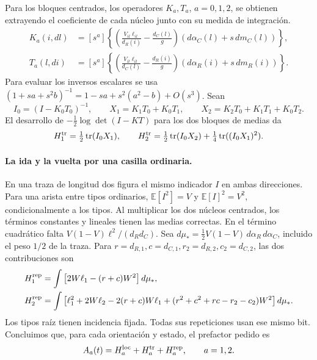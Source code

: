Para los bloques centrados, los operadores \(K_a,T_a\), \(a=0,1,2\), se obtienen
extrayendo el coeficiente de cada núcleo junto con su medida de integración.
\begin{align*}
 K_a(i,dl)&=[s^a]\left\{\left(\frac{V_{il}\ell_{il}}{d_R(i)}-\frac{d_C(l)}g\right)
                       (d\alpha_C(l)+s\,dm_C(l))\right\},\\
 T_a(l,di)&=[s^a]\left\{\left(\frac{V_{il}\ell_{il}}{d_C(l)}-\frac{d_R(i)}g\right)
                       (d\alpha_R(i)+s\,dm_R(i))\right\}.
\end{align*}
Para evaluar los inversos escalares
se usa \((1+sa+s^2b)^{-1}=1-sa+s^2(a^2-b)+O(s^3)\). Sean
\[
 I_0=(I-K_0T_0)^{-1},\qquad X_1=K_1T_0+K_0T_1,\qquad
 X_2=K_2T_0+K_1T_1+K_0T_2 .
\]
El desarrollo de \(-\tfrac12\log\det(I-KT)\) para los dos bloques de medias da
\[
 H_1^{\rm tr}=\tfrac12\operatorname{tr}(I_0X_1),\qquad
 H_2^{\rm tr}=\tfrac12\operatorname{tr}(I_0X_2)+\tfrac14\operatorname{tr}((I_0X_1)^2).
\]

\paragraph{La ida y la vuelta por una casilla ordinaria.}
En una traza de longitud dos figura el mismo indicador \(I\) en ambas direcciones.
Para una arista entre tipos ordinarios, \(\mathbb E[I^2]=V\) y
\(\mathbb E[I]^2=V^2\), condicionalmente a los tipos. Al multiplicar los dos núcleos
centrados, los términos constantes y lineales tienen las medias correctas. En el
término cuadrático falta \(V(1-V)\ell^2/(d_Rd_C)\). Sea \(d\mu_*=\tfrac12
V(1-V)\,d\alpha_R\,d\alpha_C\), incluido el peso \(1/2\) de la traza. Para
\(r=d_{R,1}, c=d_{C,1}, r_2=d_{R,2}, c_2=d_{C,2}\), las dos contribuciones son
\begin{align*}
 H_1^{\rm rep}&=\int \big[2W\ell_1-(r+c)W^2\big]\,d\mu_*,\\
 H_2^{\rm rep}&=\int \big[\ell_1^2+2W\ell_2-2(r+c)W\ell_1
              +(r^2+c^2+rc-r_2-c_2)W^2\big]\,d\mu_* .
\end{align*}
Los tipos raíz tienen incidencia fijada. Todas sus repeticiones usan ese mismo bit.
Concluimos que, para cada orientación y estado, el prefactor pedido es
\[
 A_a(t)=H_a^{\rm loc}+H_a^{\rm tr}+H_a^{\rm rep},\qquad a=1,2 .
\]

